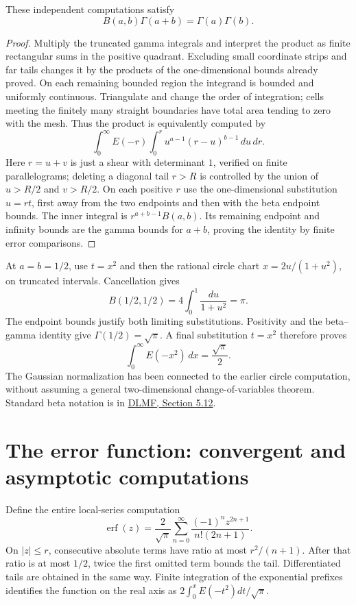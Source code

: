\begin{theorem}
\label{thm:beta-gamma}
These independent computations satisfy
\[
 B(a,b)\Gamma(a+b)=\Gamma(a)\Gamma(b).
\]
\end{theorem}
\begin{proof}
Multiply the truncated gamma integrals and interpret the product as finite
rectangular sums in the positive quadrant.  Excluding small coordinate
strips and far tails changes it by the products of the one-dimensional
bounds already proved.  On each remaining bounded region the integrand
is bounded and uniformly continuous.  Triangulate and change the order of
integration; cells meeting the finitely many straight boundaries have
total area tending to zero with the mesh.  Thus the product is equivalently
computed by
\[
 \int_0^\infty E(-r)\int_0^r u^{a-1}(r-u)^{b-1}\,du\,dr.
\]
Here $r=u+v$ is just a shear with determinant $1$, verified on finite
parallelograms; deleting a diagonal tail $r>R$ is controlled by the union
of $u>R/2$ and $v>R/2$.  On each positive $r$ use the one-dimensional
substitution $u=rt$, first away from the two endpoints and then with
the beta endpoint bounds.  The inner integral is $r^{a+b-1}B(a,b)$.
Its remaining endpoint and infinity bounds are the gamma bounds for
$a+b$, proving the identity by finite error comparisons.
\end{proof}

At $a=b=1/2$, use $t=x^2$ and then the rational circle chart
$x=2u/(1+u^2)$, on truncated intervals.  Cancellation gives
\[
 B(1/2,1/2)=4\int_0^1\frac{du}{1+u^2}=\pi.
\]
The endpoint bounds justify both limiting substitutions.  Positivity and
the beta--gamma identity give $\Gamma(1/2)=\sqrt\pi$.  A final
substitution $t=x^2$ therefore proves
\[
 \int_0^\infty E(-x^2)\,dx=\frac{\sqrt\pi}{2}.
\]
The Gaussian normalization has been connected to the earlier circle
computation, without assuming a general two-dimensional change-of-variables
theorem.  Standard beta notation is in
\href{https://dlmf.nist.gov/5.12}{DLMF, Section 5.12}.

\section{The error function: convergent and asymptotic computations}
Define the entire local-series computation
\[
 \operatorname{erf}(z)=\frac2{\sqrt\pi}
       \sum_{n=0}^\infty\frac{(-1)^nz^{2n+1}}{n!(2n+1)}.
\]
On $|z|\le r$, consecutive absolute terms have ratio at most
$r^2/(n+1)$.  After that ratio is at most $1/2$, twice the first omitted
term bounds the tail.  Differentiated tails are obtained in the same way.
Finite integration of the exponential prefixes identifies the function
on the real axis as $2\int_0^x E(-t^2)dt/\sqrt\pi$.

